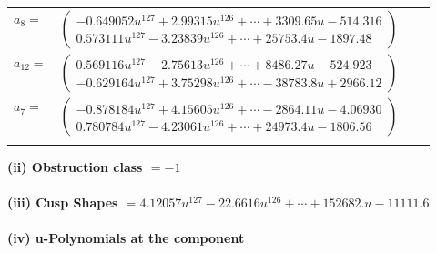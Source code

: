 \documentclass[1p]{elsarticle_modified}
\theoremstyle{definition}
\begin{document}
\begin{tabular}{m{7pt} m{180pt} m{7pt} m{180pt} }
\flushright $a_{8}=$&$\begin{pmatrix}-0.649052 u^{127}+2.99315 u^{126}+\cdots+3309.65 u-514.316\\0.573111 u^{127}-3.23839 u^{126}+\cdots+25753.4 u-1897.48\end{pmatrix}$ \\
\flushright $a_{12}=$&$\begin{pmatrix}0.569116 u^{127}-2.75613 u^{126}+\cdots+8486.27 u-524.923\\-0.629164 u^{127}+3.75298 u^{126}+\cdots-38783.8 u+2966.12\end{pmatrix}$ \\
\flushright $a_{7}=$&$\begin{pmatrix}-0.878184 u^{127}+4.15605 u^{126}+\cdots-2864.11 u-4.06930\\0.780784 u^{127}-4.23061 u^{126}+\cdots+24973.4 u-1806.56\end{pmatrix}$\\&\end{tabular}
\flushleft \textbf{(ii) Obstruction class $= -1$}\\~\\
\flushleft \textbf{(iii) Cusp Shapes $= 4.12057 u^{127}-22.6616 u^{126}+\cdots+152682. u-11111.6$}\\~\\
\newpage\renewcommand{\arraystretch}{1}
\flushleft \textbf{(iv) u-Polynomials at the component}\newline \\
\end{document}
